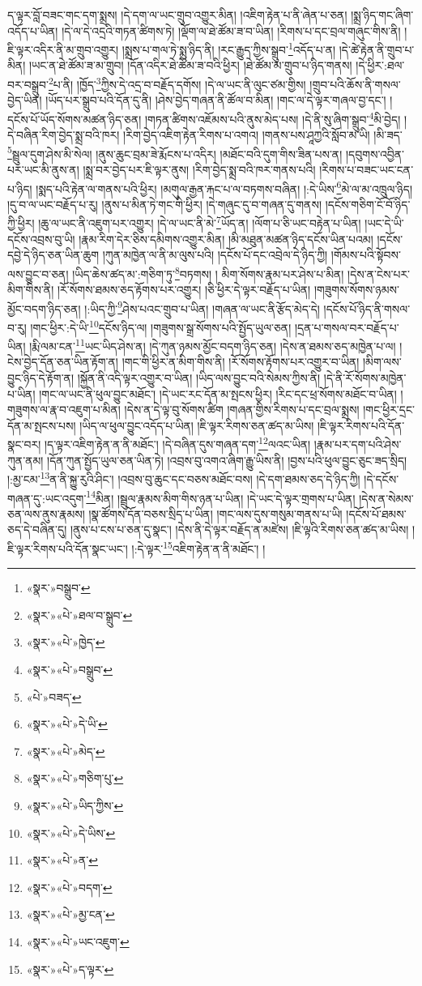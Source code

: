 ད་ལྟར་བློ་བཟང་གང་དག་སྨྲས། །དེ་དག་ལ་ཡང་གྲུབ་འགྱུར་མིན། །འཇིག་རྟེན་པ་ནི་ཞེན་པ་ཅན། །སྨྲ་ཉིད་གང་ཞིག་འདོད་པ་ཡིན། །དེ་ལ་དེ་འདྲའི་གཏན་ཚིགས་ཏེ། །ལྡོག་ལ་ཐེ་ཚོམ་ཟ་བ་ཡིན། །རིགས་པ་དང་བྲལ་གཞུང་གིས་ནི། །ཇི་ལྟར་འདིར་ནི་མ་གྲུབ་འགྱུར། །སྨྲས་པ་གལ་ཏེ་སྨྲ་ཉིད་ནི། །རང་རྒྱུད་ཀྱིས་སྒྲུབ་\footnote{«སྣར་»བསྒྲུབ་}འདོད་པ་ན། །དེ་ཚེ་རྟེན་ནི་གྲུབ་པ་མིན། །ཡང་ན་ཐེ་ཚོམ་ཟ་མ་གྲུབ། །དོན་འདིར་ཐེ་ཚོམ་ཟ་བའི་ཕྱིར། །ཐེ་ཚོམ་མ་གྲུབ་པ་ཉིད་གནས། །དེ་ཕྱིར་:ཐལ་བར་བསྒྲུབ་\footnote{«སྣར་»«པེ་»ཐལ་བ་སྒྲུབ་}པ་ནི། །ཁྱོད་\footnote{«སྣར་»«པེ་»ཁྱེད་}ཀྱིས་དེ་འདྲ་བ་བརྗོད་དགོས། །དེ་ལ་ཡང་ནི་ལུང་ཙམ་གྱིས། །གྲུབ་པའི་ཆོས་ནི་གསལ་བྱེད་ཡིན། །ཡོད་པར་སྒྲུབ་པའི་དོན་དུ་ནི། །ཤེས་བྱེད་གཞན་ནི་ཚོལ་བ་མིན། །གང་ལ་དེ་ལྟར་གཞལ་བྱ་དང་། །དངོས་པོ་ཡོད་སོགས་མཚན་ཉིད་ཅན། །གཏན་ཚིགས་འཇོམས་པའི་ནུས་མེད་པས། །དེ་ནི་སུ་ཞིག་སྒྲུབ་\footnote{«སྣར་»«པེ་»བསྒྲུབ་}མི་བྱེད། །དེ་བཞིན་རིག་བྱེད་སྨྲ་བའི་ཁར། །རིག་བྱེད་འཇིག་རྟེན་རིགས་པ་འགའ། །གནས་པས་ཤཱཀྱའི་སློབ་མ་ཡི། །མི་ཟད་\footnote{«པེ་»བཟད་}སྦྲུལ་དུག་ཤེས་མི་སེལ། །ནུས་ཆུང་བྲམ་ཟེ་རྨོངས་པ་འདིར། །མཐོང་བའི་དུག་གིས་ཟིན་པས་ན། །དབུགས་འབྱིན་པར་ཡང་མི་ནུས་ན། །སྨྲ་བར་བྱེད་པར་ཇི་ལྟར་ནུས། །རིག་བྱེད་སྨྲ་བའི་ཁར་གནས་པའི། །རིགས་པ་བཟང་ཡང་ངན་པ་ཉིད། །སྨད་པའི་རྟེན་ལ་གནས་པའི་ཕྱིར། །མགུལ་རྒྱན་རྐང་པ་ལ་བཏགས་བཞིན། །:དེ་ཡིས་\footnote{«སྣར་»«པེ་»དེ་ཡི་}མེ་ལ་མ་འཁྲུལ་ཉིད། །དུ་བ་ལ་ཡང་བརྗོད་པ་རུ། །ནུས་པ་མིན་ཏེ་གང་གི་ཕྱིར། །དེ་གཞུང་དུ་བ་གཞན་དུ་གནས། །དངོས་གཅིག་ངོ་བོ་ཉིད་ཀྱི་ཕྱིར། །ཆུ་ལ་ཡང་ནི་འཇུག་པར་འགྱུར། །དེ་ལ་ཡང་ནི་མེ་\footnote{«སྣར་»«པེ་»མེད་}ཡོད་ན། །ལོག་པ་ཅི་ཡང་བརྟེན་པ་ཡིན། །ཡང་དེ་ཡི་དངོས་འབྲས་བུ་ཡི། །རྣམ་རིག་དེར་ཅིས་དམིགས་འགྱུར་མིན། །མི་མཐུན་མཚན་ཉིད་དངོས་ཡིན་པའམ། །དངོས་དབྱེ་དེ་ཉིད་ཅན་ཡིན་ཆུག །ཀུན་མཁྱེན་ལ་ནི་མ་ལུས་པའི། །དངོས་པོ་དང་འབྲེལ་དེ་ཉིད་ཀྱི། །གོམས་པའི་སྟོབས་ལས་བྱུང་བ་ཅན། །ཡིད་ཆེས་ཚད་མ་:གཅིག་ཏུ་\footnote{«སྣར་»«པེ་»གཅིག་པུ་}བཏགས། །
མིག་སོགས་རྣམ་པར་ཤེས་པ་མིན། །དེས་ན་ངེས་པར་མིག་གིས་ནི། །རོ་སོགས་ཐམས་ཅད་རྟོགས་པར་འགྱུར། །ཅི་ཕྱིར་དེ་ལྟར་བརྗོད་པ་ཡིན། །གཟུགས་སོགས་ཉམས་མྱོང་བདག་ཉིད་ཅན། །:ཡིད་ཀྱི་\footnote{«སྣར་»«པེ་»ཡིད་ཀྱིས་}ཤེས་པའང་གྲུབ་པ་ཡིན། །གཞན་ལ་ཡང་ནི་རྩོད་མེད་དེ། །དངོས་པོ་ཉིད་ནི་གསལ་བ་རུ། །གང་ཕྱིར་:དེ་ཡི་\footnote{«སྣར་»«པེ་»དེ་ཡིས་}དངོས་ཉིད་ལ། །གཟུགས་སྒྲ་སོགས་པའི་སྤྱོད་ཡུལ་ཅན། །དྲན་པ་གསལ་བར་བརྗོད་པ་ཡིན། །རྨི་ལམ་ངན་\footnote{«སྣར་»«པེ་»ན་}ཡང་ཡིད་ཤེས་ན། །དེ་ཀུན་ཉམས་མྱོང་བདག་ཉིད་ཅན། །དེས་ན་ཐམས་ཅད་མཁྱེན་པ་ལ། །ངེས་བྱེད་དོན་ཅན་ཡིན་རྟོག་ན། །གང་གི་ཕྱིར་ན་མིག་གིས་ནི། །རོ་སོགས་རྟོགས་པར་འགྱུར་བ་ཡིན། །མིག་ལས་བྱུང་ཉིད་དེ་རྟོག་ན། །སྐྱོན་ནི་འདི་ལྟར་འགྱུར་བ་ཡིན། །ཡིད་ལས་བྱུང་བའི་སེམས་ཀྱིས་ནི། །དེ་ནི་རོ་སོགས་མཁྱེན་པ་ཡིན། །གང་ལ་ཡང་ནི་ཕུལ་བྱུང་མཐོང་། །དེ་ཡང་རང་དོན་མ་སྤངས་ཕྱིར། །རིང་དང་ཕྲ་སོགས་མཐོང་བ་ཡིན། །གཟུགས་ལ་རྣ་བ་འཇུག་པ་མིན། །དེས་ན་དེ་ལྟ་བུ་སོགས་ཚིག །གཞན་གྱིས་རིགས་པ་དང་བྲལ་སྨྲས། །གང་ཕྱིར་དྲང་དོན་མ་སྤངས་པས། །ཡིད་ལ་ཕུལ་བྱུང་འདོད་པ་ཡིན། །ཇི་ལྟར་རིགས་ཅན་ཚད་མ་ཡིས། །ཇི་ལྟར་རིགས་པའི་དོན་སྣང་བར། །ད་ལྟར་འཇིག་རྟེན་ན་ནི་མཐོང་། །དེ་བཞིན་དུས་གཞན་དག་\footnote{«སྣར་»«པེ་»བདག་}ལའང་ཡིན། །རྣམ་པར་དག་པའི་ཤེས་ཀུན་ནམ། །དོན་ཀུན་སྤྱོད་ཡུལ་ཅན་ཡིན་ཏེ། །འབྲས་བུ་འགའ་ཞིག་རྒྱུ་ཡིས་ནི། །བྱས་པའི་ཕུལ་བྱུང་ཅུང་ཟད་སྲིད། །:མྱ་ངམ་\footnote{«སྣར་»«པེ་»མྱ་ངན་}ན་ནི་སྐྱུ་རུའི་ཤིང་། །འབྲས་བུ་ཆུང་དང་བཅས་མཐོང་བས། །དེ་དག་ཐམས་ཅད་དེ་ཉིད་ཀྱི། །དེ་དངོས་གཞན་དུ་:ཡང་འདུག་\footnote{«སྣར་»«པེ་»ཡང་འཇུག་}མིན། །སྦྲུལ་རྣམས་མིག་གིས་ཉན་པ་ཡིན། །དེ་ཡང་དེ་ལྟར་གྲགས་པ་ཡིན། །དེས་ན་སེམས་ཅན་ལས་ནུས་རྣམས། །སྣ་ཚོགས་དོན་བཅས་སྲིད་པ་ཡིན། །གང་ལས་དུས་གསུམ་གནས་པ་ཡི། །དངོས་པོ་ཐམས་ཅད་དེ་བཞིན་དུ། །ནུས་པ་ངས་པ་ཅན་དུ་སྣང་། །དེས་ནི་དེ་ལྟར་བརྗོད་ན་མཛེས། །ཇི་ལྟའི་རིགས་ཅན་ཚད་མ་ཡིས། །ཇི་ལྟར་རིགས་པའི་དོན་སྣང་ཡང་། །:དེ་ལྟར་\footnote{«སྣར་»«པེ་»ད་ལྟར་}འཇིག་རྟེན་ན་ནི་མཐོང་། །
